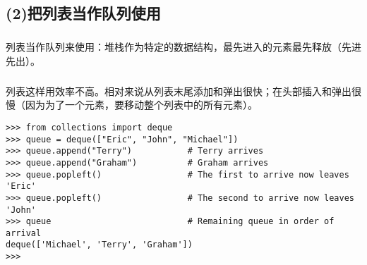 \documentclass{article}
\begin{document}
\begin{CJK}{UTF8}{gbsn}
\subsection*{(2)把列表当作队列使用}
\subparagraph*{}
列表当作队列来使用：堆栈作为特定的数据结构，最先进入的元素最先释放（先进先出）。
\subparagraph*{}
列表这样用效率不高。相对来说从列表末尾添加和弹出很快；在头部插入和弹出很慢（因为为了一个元素，要移动整个列表中的所有元素）。
\begin{verbatim}
>>> from collections import deque
>>> queue = deque(["Eric", "John", "Michael"])
>>> queue.append("Terry")           # Terry arrives
>>> queue.append("Graham")          # Graham arrives
>>> queue.popleft()                 # The first to arrive now leaves
'Eric'
>>> queue.popleft()                 # The second to arrive now leaves
'John'
>>> queue                           # Remaining queue in order of arrival
deque(['Michael', 'Terry', 'Graham'])
>>>
\end{verbatim}

\end{CJK}
\end{document}
